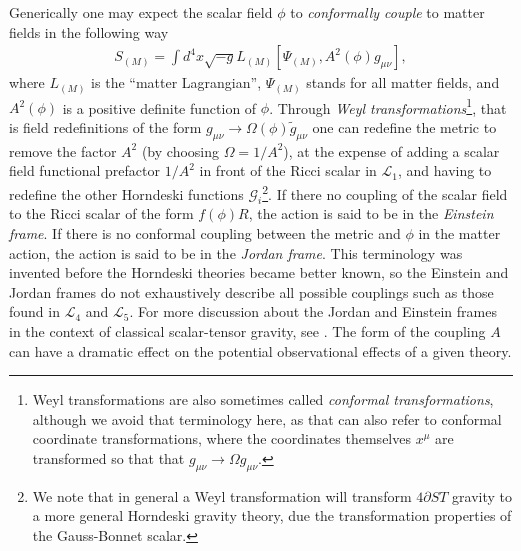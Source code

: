 \documentclass{ws-ijmpd}
\begin{document}
Generically one may expect the scalar field $\phi$ to 
\emph{conformally couple} to 
matter fields in the following way\cite{fujii_maeda_2003,will_2018} 
\begin{align}
   S_{(M)}
   =
   \int d^4x\sqrt{-g}L_{(M)}\left[
      \Psi_{(M)},A^2\left(\phi\right)g_{\mu\nu}
   \right]
   ,
\end{align}
where $L_{(M)}$ is the ``matter Lagrangian'', $\Psi_{(M)}$ stands for
all matter fields, and $A^2\left(\phi\right)$
is a positive definite function of $\phi$.
Through \emph{Weyl transformations}\footnote{Weyl transformations
are also sometimes called \emph{conformal transformations},
although we avoid that terminology here, as that 
can also refer to conformal coordinate transformations, where the
coordinates themselves $x^{\mu}$ are transformed so that that
$g_{\mu\nu}\to\Omega g_{\mu\nu}$.}, that is field redefinitions
of the form $g_{\mu\nu}\to\Omega\left(\phi\right)\tilde{g}_{\mu\nu}$
one can redefine the metric to remove the factor $A^2$
(by choosing $\Omega=1/A^2$),
at the expense of adding a scalar field functional prefactor
$1/A^2$ in front of the Ricci scalar in $\mathcal{L}_1$,
and having to redefine the other Horndeski functions 
$\mathcal{G}_i$\footnote{We
note that in general a Weyl transformation will transform $4\partial ST$
gravity to a more general Horndeski gravity theory, 
due the transformation properties of the 
Gauss-Bonnet scalar\cite{Maeda:2009uy}.}.
If there no coupling of the scalar field to
the Ricci scalar of the form $f\left(\phi\right)R$, the action
is said to be in the \emph{Einstein frame}.
If there is no conformal coupling between the metric and $\phi$
in the matter action, the action is said to be in the
\emph{Jordan frame}.
This terminology
was invented before the Horndeski theories became better known,
so the Einstein and Jordan frames do not exhaustively describe all
possible couplings such as those found in $\mathcal{L}_4$ and $\mathcal{L}_5$.
For more discussion about the Jordan and Einstein frames
in the context of classical scalar-tensor gravity, see .
The form of the coupling $A$
can have a dramatic effect on the potential observational effects
of a given theory\cite{Damour:1996ke,fujii_maeda_2003,Will:2014kxa,will_2018}. 
\end{document}
